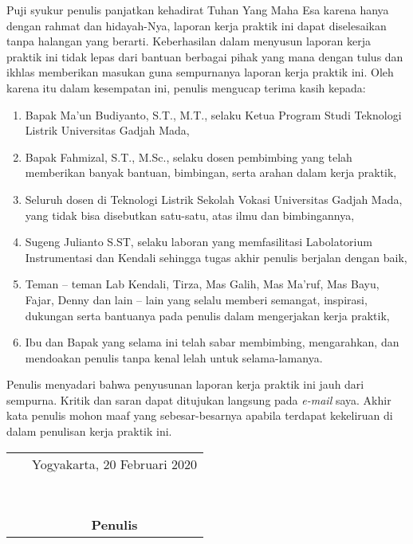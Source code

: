 \documentclass{DTEDI_KP}
\begin{document}
	
	\cover
	
	\approvalpage
	
	\preface
	
Puji syukur penulis panjatkan kehadirat Tuhan Yang Maha Esa karena hanya dengan rahmat dan hidayah-Nya, laporan kerja praktik ini dapat diselesaikan tanpa halangan yang berarti. Keberhasilan dalam menyusun laporan kerja praktik ini tidak lepas dari bantuan berbagai pihak yang mana dengan tulus dan ikhlas memberikan masukan guna sempurnanya laporan kerja praktik ini.  Oleh karena itu dalam kesempatan ini, penulis mengucap terima kasih kepada:
	
	\begin{enumerate}
		\item Bapak Ma’un Budiyanto, S.T., M.T., selaku Ketua Program Studi Teknologi Listrik Universitas Gadjah Mada,
		\item  Bapak Fahmizal, S.T., M.Sc., selaku dosen pembimbing yang telah memberikan banyak bantuan, bimbingan, serta arahan dalam kerja praktik,
		\item Seluruh dosen di Teknologi Listrik Sekolah Vokasi Universitas Gadjah Mada, yang tidak bisa disebutkan satu-satu, atas ilmu dan bimbingannya,
		\item Sugeng Julianto S.ST, selaku laboran yang memfasilitasi Labolatorium Instrumentasi dan Kendali sehingga tugas akhir penulis berjalan dengan baik, 
		\item Teman – teman Lab Kendali, Tirza, Mas Galih, Mas Ma'ruf, Mas Bayu, Fajar, Denny dan lain – lain yang selalu memberi semangat, inspirasi, dukungan serta bantuanya pada penulis dalam mengerjakan kerja praktik,
		\item Ibu dan Bapak yang selama ini telah sabar membimbing, mengarahkan, dan mendoakan penulis tanpa kenal lelah untuk selama-lamanya.
		
	\end{enumerate}

Penulis menyadari bahwa penyusunan laporan kerja praktik ini jauh dari sempurna. Kritik dan saran dapat ditujukan langsung pada \textit{e-mail} saya. Akhir kata penulis mohon maaf yang sebesar-besarnya apabila terdapat kekeliruan di dalam penulisan kerja praktik ini.

\vspace{0.1cm}

	\begin{tabular}{p{7.5cm}c}
	&Yogyakarta, 20 Februari 2020 \\\
	&\\
	&\\
	&\\
	&\\
	&\textbf{Penulis}
	\end{tabular}
\end{document}
